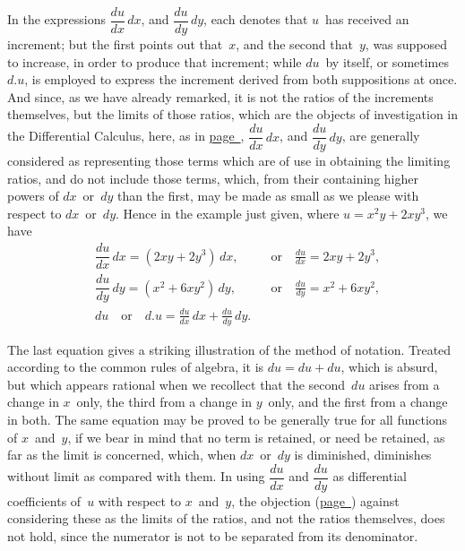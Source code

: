 \documentclass[12pt]{book}[2005/09/16]
\newcommand{\Chg}[2]{#2}
\newcommand{\Add}[1]{\Chg{}{#1}}
\newcommand{\Pagelabel}[1]{\phantomsection\label{page:#1}}
\newcommand{\PageSep}[1]{\Pagelabel{#1}\ignorespaces}
\newcommand{\PageRef}[2][page]{\hyperref[page:#2]{#1~\pageref*{page:#2}}}
\renewcommand{\(}{{\upshape(}}
\renewcommand{\)}{{\upshape)}}
\begin{document}
In the expressions $\dfrac{du}{dx}\, dx$, and $\dfrac{du}{dy}\, dy$, each denotes
that $u$~has received an increment; but the first points
out that~$x$, and the second that~$y$, was supposed to increase,
in order to produce that increment; while $du$~by
itself, or sometimes $d.u$, is employed to express
the increment derived from both suppositions at once.
And since, as we have already remarked, it is not the
ratios of the increments themselves, but the limits of
those ratios, which are the objects of investigation in
\PageSep{81}
the Differential Calculus, here, as in \PageRef{28}, $\dfrac{du}{dx}\, dx$,
and $\dfrac{du}{dy}\, dy$, are generally considered as representing
those terms which are of use in obtaining the limiting
ratios, and do not include those terms, which, from
%
%
their containing higher powers of $dx$~or~$dy$ than the
first, may be made as small as we please with respect
to $dx$~or~$dy$. Hence in the example just given, where
$u = x^{2} y + 2xy^{3}$, we have
\begin{align*}
&\dfrac{du}{dx}\, dx = (2xy + 2y^{3})\, dx,
  &&\text{or}\quad \frac{du}{dx} = 2xy + 2y^{3}\Add{,} \\
&\dfrac{du}{dy}\, dy = (x^{2} + 6xy^{2})\, dy,
  &&\text{or}\quad \frac{du}{dy} = x^{2} + 6xy^{2}\Add{,} \\
&du \quad\text{or}\quad d.u = \frac{du}{dx}\, dx + \frac{du}{dy}\,dy.
\end{align*}

The last equation gives a striking illustration of
the method of notation. Treated according to the
common rules of algebra, it is $du = du + du$, which is
absurd, but which appears rational when we recollect
that the second~$du$ arises from a change in $x$~only, the
third from a change in $y$~only, and the first from a
change in both. The same equation may be proved
to be generally true for all functions of $x$~and~$y$, if we
bear in mind that no term is retained, or need be retained,
as far as the limit is concerned, which, when
$dx$~or~$dy$ is diminished, diminishes without limit as
compared with them. In using $\dfrac{du}{dx}$ and $\dfrac{du}{dy}$ as differential
coefficients of~$u$ with respect to $x$~and~$y$, the objection
(\PageRef{27}) against considering these as the
limits of the ratios, and not the ratios themselves,
does not hold, since the numerator is not to be separated
from its denominator.
\PageSep{82}
\end{document}
